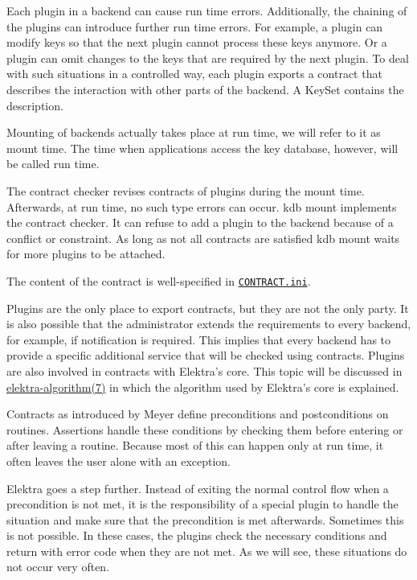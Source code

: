 Each plugin in a backend can cause run time errors. Additionally, the chaining of the plugins can introduce further run time errors. For example, a plugin can modify keys so that the next plugin cannot process these keys anymore. Or a plugin can omit changes to the keys that are required by the next plugin. To deal with such situations in a controlled way, each plugin exports a contract that describes the interaction with other parts of the backend. A {\ttfamily Key\+Set} contains the description.

Mounting of backends actually takes place at run time, we will refer to it as mount time. The time when applications access the key database, however, will be called run time.

The contract checker revises contracts of plugins during the mount time. Afterwards, at run time, no such type errors can occur. {\ttfamily kdb mount} implements the contract checker. It can refuse to add a plugin to the backend because of a conflict or constraint. As long as not all contracts are satisfied {\ttfamily kdb mount} waits for more plugins to be attached.

The content of the contract is well-\/specified in \href{/home/markus/Projekte/Elektra/current/doc/CONTRACT.ini}{\tt C\+O\+N\+T\+R\+A\+C\+T.\+ini}.

Plugins are the only place to export contracts, but they are not the only party. It is also possible that the administrator extends the requirements to every backend, for example, if notification is required. This implies that every backend has to provide a specific additional service that will be checked using contracts. Plugins are also involved in contracts with Elektra's core. This topic will be discussed in \hyperlink{md_doc_help_elektra-algorithm_doc_help_elektra-algorithm_md}{elektra-\/algorithm(7)} in which the algorithm used by Elektra's core is explained.

Contracts as introduced by Meyer define preconditions and postconditions on routines. Assertions handle these conditions by checking them before entering or after leaving a routine. Because most of this can happen only at run time, it often leaves the user alone with an exception.

Elektra goes a step further. Instead of exiting the normal control flow when a precondition is not met, it is the responsibility of a special plugin to handle the situation and make sure that the precondition is met afterwards. Sometimes this is not possible. In these cases, the plugins check the necessary conditions and return with error code when they are not met. As we will see, these situations do not occur very often.

